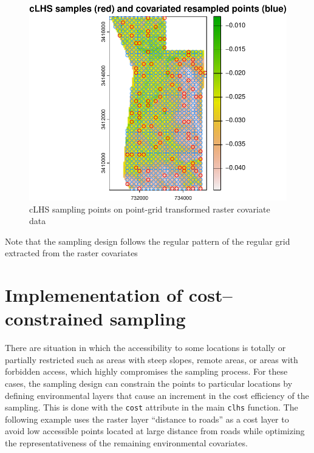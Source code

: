\documentclass[
  10pt,
  b5paper,
  oneside]{book}
\begin{document}
\begin{figure}
\centering
\includegraphics{Technical-Manual-Soil-Sampling-Design_files/figure-latex/fig-20-1.pdf}
\caption{\label{fig:fig-20}cLHS sampling points on point-grid transformed raster covariate data}
\end{figure}

Note that the sampling design follows the regular pattern of the regular grid extracted from the raster covariates

\hypertarget{implemenentation-of-costconstrained-sampling}{%
\section{Implemenentation of cost--constrained sampling}\label{implemenentation-of-costconstrained-sampling}}

There are situation in which the accessibility to some locations is totally or partially restricted such as areas with steep slopes, remote areas, or areas with forbidden access, which highly compromises the sampling process. For these cases, the sampling design can constrain the points to particular locations by defining environmental layers that cause an increment in the cost efficiency of the sampling. This is done with the \texttt{cost} attribute in the main \texttt{\textquotesingle{}clhs\textquotesingle{}} function. The following example uses the raster layer ``distance to roads'' as a cost layer to avoid low accessible points located at large distance from roads while optimizing the representativeness of the remaining environmental covariates.
\end{document}
